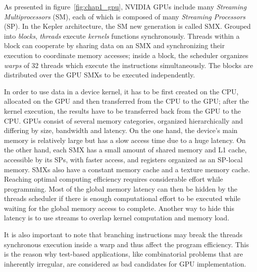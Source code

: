 As presented in figure~\ref{fig:chap1_gpu}, NVIDIA GPUs include many \emph{Streaming Multiprocessors} (SM), each of which is composed of many \emph{Streaming Processors} (SP). In the Kepler architecture, the SM new generation is called SMX.
%
Grouped into \emph{blocks}, \textit{threads} execute \emph{kernels} functions synchronously.
Threads within a block can cooperate by sharing data on an SMX and synchronizing their execution to coordinate memory accesses; inside a block, the scheduler organizes \emph{warps} of 32 threads which execute the instructions simultaneously.
The blocks are distributed over the GPU SMXs to be executed independently.

In order to use data in a device kernel, it has to be first created on the CPU, allocated on the GPU and then transferred from the CPU to the GPU; after the kernel execution, the results have to be transferred back from the GPU to the CPU. 
GPUs consist of several memory categories, organized hierarchically and differing by size, bandwidth and latency.   
On the one hand, the device's main memory is relatively large but has a slow access time due to a huge latency. 
On the other hand, each SMX has a small amount of shared memory and L1 cache, accessible by its SPs, with faster access, and registers organized as an SP-local memory. 
SMXs also have a constant memory cache and a texture memory cache.
Reaching optimal computing efficiency requires considerable effort while programming.
Most of the global memory latency can then be hidden by the threads scheduler if there is enough computational effort to be executed while waiting for the global memory access to complete. Another way to hide this latency is to use streams to overlap kernel computation and memory load. 

It is also important to note that branching instructions may break the threads synchronous execution inside a warp and thus affect the program efficiency. 
This is the reason why test-based applications, like combinatorial problems that are inherently irregular, are considered as bad candidates for GPU implementation.\\ 

